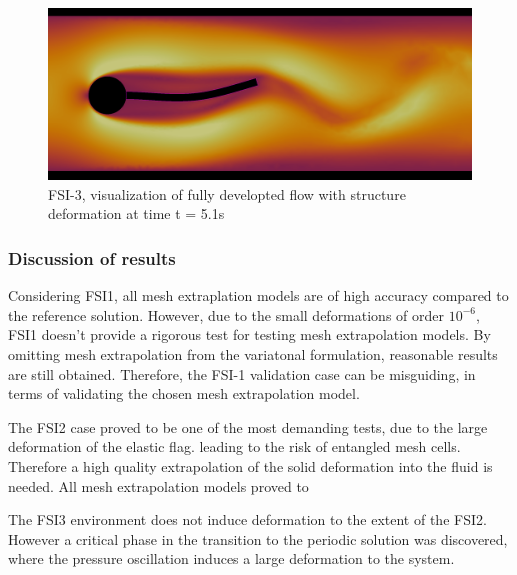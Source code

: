 \begin{figure}[h!]
  \centering
    \includegraphics[scale=0.2]{./Fig/fsi3flow.png}
      \caption{FSI-3, visualization of fully developted flow with structure deformation at time t = 5.1s}
\end{figure}

\newpage
\subsubsection*{Discussion of results}
Considering FSI1, all mesh extraplation models are of high accuracy compared to the reference solution.  However, due to the small deformations of order $10^{-6}$, FSI1 doesn't provide a rigorous test for testing mesh extrapolation models. By omitting mesh extrapolation from the variatonal formulation,  reasonable results are still obtained. Therefore, the  FSI-1 validation case can be misguiding, in terms of validating the chosen mesh extrapolation model. 

The FSI2 case proved to be one of the most demanding tests, due to the large deformation of the elastic flag. leading to the risk of entangled mesh cells. Therefore a high quality extrapolation of the solid deformation into the fluid is needed. All mesh extrapolation models proved to

The FSI3 environment does not induce deformation to the extent of the FSI2. However a critical phase in the transition to the periodic solution was discovered, where the pressure oscillation induces a large deformation to the system.










 

